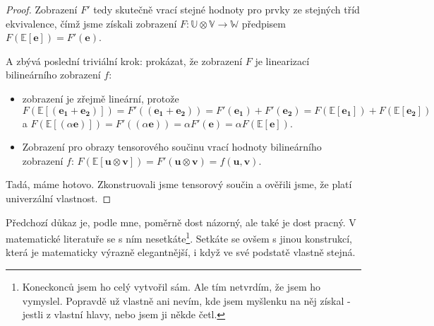 \documentclass[a5paper,12pt]{amsbook}
\theoremstyle{definition}
\newcommand{\myvec}[1]{\bm{#1}}
\newcommand{\myspace}[1]{\mathbb{#1}}
\begin{document}
\begin{proof}
Zobrazení $F'$ tedy skutečně vrací stejné hodnoty pro prvky ze stejných tříd ekvivalence,
čímž jsme získali zobrazení $F: \myspace{U}\otimes\myspace{V}\rightarrow\myspace{W}$
předpisem $F(\myspace{E}[\myvec{e}]) = F'(\myvec{e})$.

A zbývá poslední triviální krok: prokázat, že zobrazení $F$ je linearizací bilineárního
zobrazení $f$:
\begin{itemize}
\item zobrazení je zřejmě lineární, protože $F(\myspace{E}[(\myvec{e_1} + \myvec{e_2})])
= F'((\myvec{e_1} + \myvec{e_2})) = F'(\myvec{e_1}) + F'(\myvec{e_2})
= F(\myspace{E}[\myvec{e_1}]) + F(\myspace{E}[\myvec{e_2}])$
a $F(\myspace{E}[(\alpha\myvec{e})]) = F'((\alpha\myvec{e})) = \alpha F'(\myvec{e})
= \alpha F(\myspace{E}[\myvec{e}])$.
\item Zobrazení pro obrazy tensorového součinu vrací hodnoty bilineárního zobrazení $f$:
$F(\myspace{E}[\myvec{u}\otimes\myvec{v}]) = F'(\myvec{u}\otimes\myvec{v}) 
= f(\myvec{u}, \myvec{v})$.
\end{itemize}
Tadá, máme hotovo. Zkonstruovali jsme tensorový součin a ověřili jsme, že platí univerzální
vlastnost.
\end{proof}

Předchozí důkaz je, podle mne, poměrně dost názorný, ale také je dost pracný. V matematické
literatuře se s ním nesetkáte\footnote{
	Koneckonců jsem ho celý vytvořil sám. Ale tím netvrdím, že jsem ho vymyslel. Popravdě
	už vlastně ani nevím, kde jsem myšlenku na něj získal - jestli z vlastní hlavy, nebo
	jsem ji někde četl.
}. Setkáte se ovšem s jinou konstrukcí, která je matematicky výrazně elegantnější, i když
ve své podstatě vlastně stejná.
\end{document}

